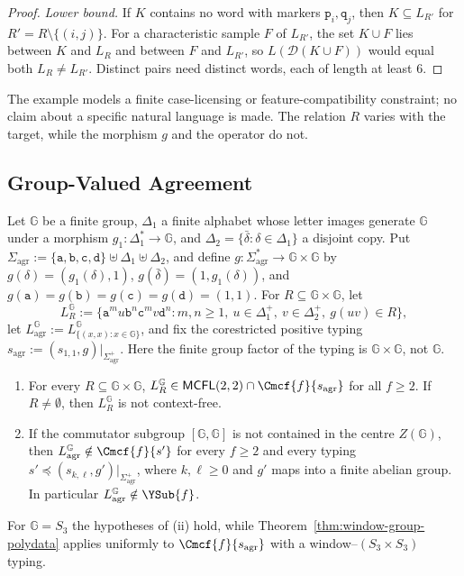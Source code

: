 \begin{proof}
\emph{Lower bound.}  If $K$ contains no word with markers $\mathtt p_i,\mathtt q_j$,
then $K\subseteq L_{R'}$ for $R'=R\setminus\{(i,j)\}$.  For a characteristic sample $F$
of $L_{R'}$, the set $K\cup F$ lies between $K$ and $L_R$ and between $F$ and
$L_{R'}$, so $L(\mathcal D(K\cup F))$ would equal both $L_R\ne L_{R'}$.  Distinct pairs
need distinct words, each of length at least $6$.
\end{proof}

The example models a finite case-licensing or feature-compatibility constraint; no
claim about a specific natural language is made.  The relation $R$ varies with the
target, while the morphism $g$ and the operator do not.

\subsection{Group-Valued Agreement}
\label{app:group-agreement}

Let ${\mathbb G}$ be a finite group, $\Delta_1$ a finite alphabet whose letter
images generate ${\mathbb G}$ under a morphism $g_1:\Delta_1^*\to {\mathbb G}$, and
$\Delta_2=\{\bar\delta:\delta\in\Delta_1\}$ a disjoint copy.  Put
$\Sigma_{\mathrm{agr}}:=\{\mathtt a,\mathtt b,\mathtt c,\mathtt d\}
\uplus\Delta_1\uplus\Delta_2$, and define
$g:\Sigma_{\mathrm{agr}}^*\to {\mathbb G}\times {\mathbb G}$ by
$g(\delta)=(g_1(\delta),1)$, $g(\bar\delta)=(1,g_1(\delta))$,
and $g(\mathtt a)=g(\mathtt b)=g(\mathtt c)=g(\mathtt d)=(1,1)$.
For $R\subseteq {\mathbb G}\times {\mathbb G}$, let
\[
 L_R^{\mathbb G}:=\{\mathtt a^m u\mathtt b^n\mathtt c^m v\mathtt d^n:
     m,n\ge1,\ u\in\Delta_1^+,\ v\in\Delta_2^+,\ g(uv)\in R\},
\]
let $L_{\mathrm{agr}}^{\mathbb G}:=L_{\{(x,x):x\in {\mathbb G}\}}^{\mathbb G}$, and fix the
corestricted positive typing
$s_{\mathrm{agr}}:=(s_{1,1},g)|_{\Sigma_{\mathrm{agr}}^+}$.
Here the finite group factor of the typing is ${\mathbb G}\times {\mathbb G}$, not ${\mathbb G}$.

\begin{proposition}
\label{prop:group-agreement}
\begin{enumerate}[label=\textup{(\roman*)},leftmargin=*]
\item For every $R\subseteq {\mathbb G}\times {\mathbb G}$,
$L_R^{\mathbb G}\in\mathsf{MCFL}(2,2)\cap\Cmcf{f}{s_{\mathrm{agr}}}$
for all $f\ge2$.  If $R\ne\emptyset$, then $L_R^{\mathbb G}$ is not context-free.
\item If the commutator subgroup $[{\mathbb G},{\mathbb G}]$ is not contained in the centre
$Z({\mathbb G})$, then $L_{\mathrm{agr}}^{\mathbb G}\notin\Cmcf{f}{s'}$ for every $f\ge2$
and every typing $s'\preceq(s_{k,\ell},g')|_{\Sigma_{\mathrm{agr}}^+}$,
where $k,\ell\ge0$ and $g'$ maps into a finite abelian group.
In particular $L_{\mathrm{agr}}^{\mathbb G}\notin\YSub{f}$.
\end{enumerate}
For ${\mathbb G}=S_3$ the hypotheses of \textup{(ii)} hold, while
Theorem~\ref{thm:window-group-polydata} applies uniformly to
$\Cmcf{f}{s_{\mathrm{agr}}}$ with a window--$(S_3\times S_3)$ typing.
\end{proposition}


